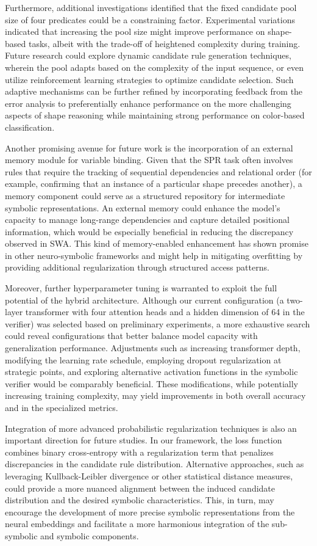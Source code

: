 \documentclass{article}
\begin{document}
Furthermore, additional investigations identified that the fixed candidate pool size of four predicates could be a constraining factor. Experimental variations indicated that increasing the pool size might improve performance on shape-based tasks, albeit with the trade-off of heightened complexity during training. Future research could explore dynamic candidate rule generation techniques, wherein the pool adapts based on the complexity of the input sequence, or even utilize reinforcement learning strategies to optimize candidate selection. Such adaptive mechanisms can be further refined by incorporating feedback from the error analysis to preferentially enhance performance on the more challenging aspects of shape reasoning while maintaining strong performance on color-based classification.

Another promising avenue for future work is the incorporation of an external memory module for variable binding. Given that the SPR task often involves rules that require the tracking of sequential dependencies and relational order (for example, confirming that an instance of a particular shape precedes another), a memory component could serve as a structured repository for intermediate symbolic representations. An external memory could enhance the model’s capacity to manage long-range dependencies and capture detailed positional information, which would be especially beneficial in reducing the discrepancy observed in SWA. This kind of memory-enabled enhancement has shown promise in other neuro-symbolic frameworks and might help in mitigating overfitting by providing additional regularization through structured access patterns.

Moreover, further hyperparameter tuning is warranted to exploit the full potential of the hybrid architecture. Although our current configuration (a two-layer transformer with four attention heads and a hidden dimension of 64 in the verifier) was selected based on preliminary experiments, a more exhaustive search could reveal configurations that better balance model capacity with generalization performance. Adjustments such as increasing transformer depth, modifying the learning rate schedule, employing dropout regularization at strategic points, and exploring alternative activation functions in the symbolic verifier would be comparably beneficial. These modifications, while potentially increasing training complexity, may yield improvements in both overall accuracy and in the specialized metrics.

Integration of more advanced probabilistic regularization techniques is also an important direction for future studies. In our framework, the loss function combines binary cross-entropy with a regularization term that penalizes discrepancies in the candidate rule distribution. Alternative approaches, such as leveraging Kullback-Leibler divergence or other statistical distance measures, could provide a more nuanced alignment between the induced candidate distribution and the desired symbolic characteristics. This, in turn, may encourage the development of more precise symbolic representations from the neural embeddings and facilitate a more harmonious integration of the sub-symbolic and symbolic components.
\end{document}

